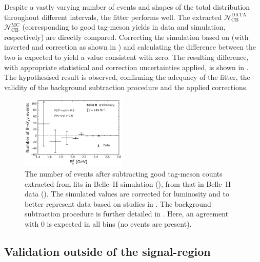Despite a vastly varying number of events and shapes of the total distribution throughout different \EB intervals,
the fitter performs well.
The extracted $\mathcal{N}_{\mathrm{CB}}^{\mathrm{DATA}}$ $\mathcal{N}_{\mathrm{CB}}^{\mathrm{MC}}$ (corresponding to good tag-\B meson yields in data and simulation, respectively)
are directly compared.
Correcting the simulation based on  (with inverted \piVeto and \etaVeto correction as shown in ) and calculating the difference between the two is expected to yield a value consistent with zero.
The resulting difference, with appropriate statistical and correction uncertainties applied, is shown in .
The hypothesised result is observed, confirming the adequacy of the fitter, the validity of the background subtraction procedure and the applied corrections.

\begin{figure}[htbp!]
    \centering
    \includegraphics[width=0.45\textwidth]{figures/data_validation/bbar_enhanced_event_counts.pdf}
    \caption{\label{fig:bbar_enhanced_background_subtraction}
    The number of events after subtracting good tag-\B meson counts extracted from fits in Belle~II simulation (),
    from that in Belle~II data ().
    The simulated values are corrected for luminosity and to better represent data based on studies in .
    The background subtraction procedure is further detailed in .
    Here, an agreement with 0 is expected in all \EB bins (no \BtoXsgamma events are present).
    }
\end{figure}

\subsection{Validation outside of the \texorpdfstring{\EB}{EB} signal-region}\label{sec:sidebands_validation}

